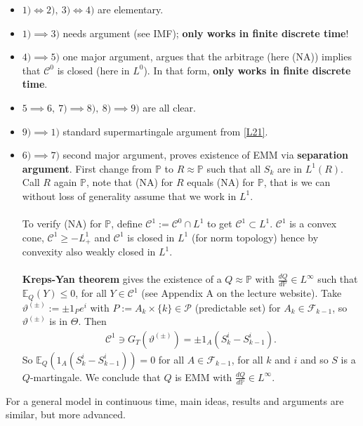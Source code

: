 \documentclass[12pt,a4paper, twoside]{article}
\theoremstyle{definition}
\newcommand{\EE}{\mathbb{E}} %
\newcommand{\PP}{\mathbb{P}} %
\begin{document}
\begin{itemize}
\item $1) \iff 2), \ 3) \iff 4)$ are elementary.
\item $1) \implies 3)$ needs argument (see IMF); \textbf{only works in finite discrete time}!
\item $4) \implies 5)$ one major argument, argues that the arbitrage (here (NA)) implies that $\mathcal{C}^0$ is closed (here in $L^0$). In that form, \textbf{only works in finite discrete time}.
\item $5 \implies 6, \ 7) \implies 8), \ 8) \implies 9)$ are all clear.
\item $9) \implies 1)$ standard supermartingale argument from \ref{L21}.
\newpage
\item $6) \implies 7)$ second major argument, proves existence of EMM via \textbf{separation argument}. First change from $\PP$ to $R \approx \PP$ such that all $S_k$ are in $L^1(R)$. Call $R$ again $\PP$, note that (NA) for $R$ equals (NA) for $\PP$, that is we can without loss of generality assume that we work in $L^1$.
\\\\
To verify (NA) for $\PP$, define $\mathcal{C}^1 := \mathcal{C}^0 \cap L^1$ to get $\mathcal{C}^1 \subset L^1$. $\mathcal{C}^1$ is a convex cone, $\mathcal{C}^1 \geq -L_+^1$ and $\mathcal{C}^1$ is closed in $L^1$ (for norm topology) hence by convexity also weakly closed in $L^1$. \\
\\
\textbf{Kreps-Yan theorem} gives the existence of a $Q \approx \PP$ with $\frac{dQ}{d \PP} \in L^\infty$ such that $\mathbb{E}_Q(Y) \leq 0$, for all $Y \in \mathcal{C}^1$ (see Appendix A on the lecture website). Take $\vartheta^{( \pm)} := \pm 1_Pe^i$ with $P:= A_k \times \{k\} \in \mathcal{P}$ (predictable set) for $A_k \in \mathcal{F}_{k-1}$, so $\vartheta^{( \pm)}$ is in $\Theta$. Then 
\begin{align*}
\mathcal{C}^1 \ni G_T( \vartheta^{(\pm)})= \pm 1_A( S_k^i-S_{k-1}^i).
\end{align*}
So $\EE_Q(1_A(S_k^i-S_{k-1}^i))=0$ for all $A \in \mathcal{F}_{k-1}$, for all $k$ and $i$ and so $S$ is a $Q$-martingale. We conclude that $Q$ is EMM with $\frac{dQ}{d \PP} \in L^\infty$. 
\end{itemize}
For a general model in continuous time, main ideas, results and arguments are similar, but more advanced.
\end{document}
